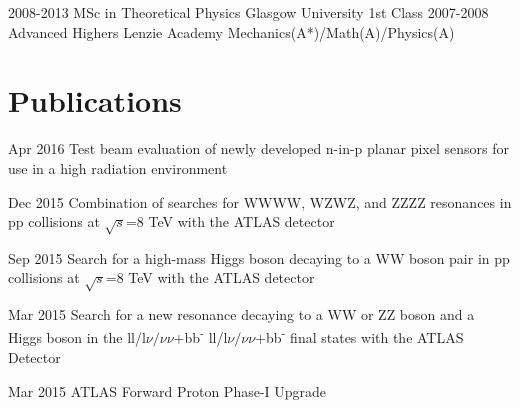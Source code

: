\documentclass[]{twentysecondcv}
\begin{document}
\begin{twenty}
  \twentyitem
    {2008-2013}
    {MSc in Theoretical Physics }
    {Glasgow University}
    {1st Class}
  \twentyitem
    {2007-2008}
    {Advanced Highers}
    {Lenzie Academy}
    {Mechanics(A*)/Math(A)/Physics(A)}
\end{twenty}



\section*{Publications}

\begin{twentyshort}
  \twentyitemshort
    {Apr 2016}
    {Test beam evaluation of newly developed n-in-p planar pixel sensors for use in a high radiation environment}
\end{twentyshort}


\begin{twentyshort}
  \twentyitemshort
    {Dec 2015}
    {Combination of searches for WWWW, WZWZ, and ZZZZ resonances in pp collisions at $\sqrt{s}$=8 TeV with the ATLAS detector}
\end{twentyshort}


\begin{twentyshort}
  \twentyitemshort
    {Sep 2015}
    {Search for a high-mass Higgs boson decaying to a WW boson pair in pp collisions at $\sqrt{s}$=8 TeV with the ATLAS detector  }
\end{twentyshort}


\begin{twentyshort}
  \twentyitemshort
    {Mar 2015}
    {Search for a new resonance decaying to a WW or ZZ boson and a Higgs boson in the ll/l$\nu/\nu\nu$+bb\textsuperscript{-} ll/l$\nu/\nu\nu$+bb\textsuperscript{-} final states with the ATLAS Detector}
\end{twentyshort}


\begin{twentyshort}
  \twentyitemshort
    {Mar 2015}
    {ATLAS Forward Proton Phase-I Upgrade }
\end{twentyshort}
\end{document}
